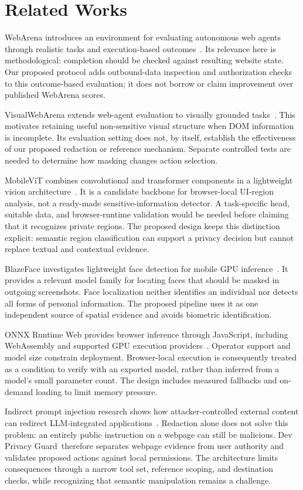 \documentclass[conference]{IEEEtran}
\newcommand{\sys}{Dev Privacy Guard}
\begin{document}
\section{Related Works}
WebArena introduces an environment for evaluating autonomous web agents through realistic tasks and execution-based outcomes~\cite{webarena}. Its relevance here is methodological: completion should be checked against resulting website state. Our proposed protocol adds outbound-data inspection and authorization checks to this outcome-based evaluation; it does not borrow or claim improvement over published WebArena scores.

VisualWebArena extends web-agent evaluation to visually grounded tasks~\cite{visualwebarena}. This motivates retaining useful non-sensitive visual structure when DOM information is incomplete. Its evaluation setting does not, by itself, establish the effectiveness of our proposed redaction or reference mechanism. Separate controlled tests are needed to determine how masking changes action selection.

MobileViT combines convolutional and transformer components in a lightweight vision architecture~\cite{mobilevit}. It is a candidate backbone for browser-local UI-region analysis, not a ready-made sensitive-information detector. A task-specific head, suitable data, and browser-runtime validation would be needed before claiming that it recognizes private regions. The proposed design keeps this distinction explicit: semantic region classification can support a privacy decision but cannot replace textual and contextual evidence.

BlazeFace investigates lightweight face detection for mobile GPU inference~\cite{blazeface}. It provides a relevant model family for locating faces that should be masked in outgoing screenshots. Face localization neither identifies an individual nor detects all forms of personal information. The proposed pipeline uses it as one independent source of spatial evidence and avoids biometric identification.

ONNX Runtime Web provides browser inference through JavaScript, including WebAssembly and supported GPU execution providers~\cite{ort}. Operator support and model size constrain deployment. Browser-local execution is consequently treated as a condition to verify with an exported model, rather than inferred from a model's small parameter count. The design includes measured fallbacks and on-demand loading to limit memory pressure.

Indirect prompt injection research shows how attacker-controlled external content can redirect LLM-integrated applications~\cite{injection}. Redaction alone does not solve this problem: an entirely public instruction on a webpage can still be malicious. \sys\ therefore separates webpage evidence from user authority and validates proposed actions against local permissions. The architecture limits consequences through a narrow tool set, reference scoping, and destination checks, while recognizing that semantic manipulation remains a challenge.
\end{document}
